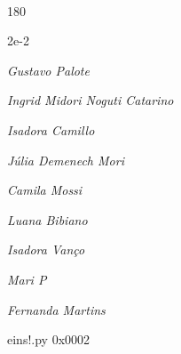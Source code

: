 \documentclass[12pt]{article}
\begin{document}
	\hfill	  	  


\pagebreak			

	\ 
	\vfill
	\begin{turn}{180}	
		\begin{minipage}{\textwidth}
		  	\ttfamily %
			\centering
			{\Huge 2e-2}
		  
			\hfill
		  
			

\textit{\small Gustavo Palote}

\textit{\small Ingrid Midori Noguti Catarino}

\textit{\small Isadora Camillo}

\textit{\small Júlia Demenech Mori}

\textit{\small Camila Mossi}

\textit{\small Luana Bibiano}

\textit{\small Isadora Vanço}

\textit{\small Mari P}

\textit{\small Fernanda Martins}

\bigskip

eins!.py
0x0002


		\end{minipage}	
	\end{turn}
	\vfill
	\

\pagebreak
\end{document}
